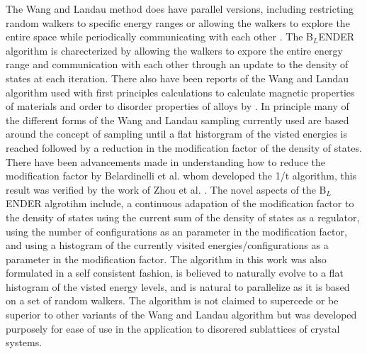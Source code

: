 \documentclass[aps,prl,reprint,superscriptaddress,showkeys]{revtex4-1}
\begin{document}
    The Wang and Landau method does have parallel versions, including  restricting random walkers to specific energy ranges or allowing the walkers to explore the entire space while periodically communicating with each other \cite{MP_Wang_Landau,P_imp_Wang_Landau, Hframe_Wang_Landau}. The B$_{L}$ENDER algorithm is charecterized by allowing the walkers to expore the entire energy range and communication with each other through an update to the density of states at each iteration. There also have been  reports of the Wang and Landau algorithm used with first principles calculations to calculate magnetic properties of materials and order to disorder properties of alloys by \cite{Eisenbach, FP_Wang_Landau_CuZn}. In principle many of the different forms of the Wang and Landau sampling currently used are based around the concept of sampling until a flat historgram of the visted energies is reached followed by a reduction in the modification factor of the density of states. There have been advancements made in understanding how to reduce the modification factor by Belardinelli et al. \cite{saturation} whom developed the 1/t algorithm, this result was verified by the work of Zhou et al. \cite{Optimal_modification}. The novel aspects of the B$_{L}$ENDER algrotihm include, a continuous adapation of the modification factor to the  density of states using the current sum of the density of states as a regulator, using the number of configurations as an parameter in the modification factor, and using a histogram of the currently visited energies/configurations as a parameter in the modification factor.  The algorithm in this work was also formulated in a self consistent fashion, is believed to naturally evolve to a flat histogram of the visted energy levels, and is natural to parallelize as it is based on a set of random walkers. The algorithm is not claimed to supercede or be superior to other variants of the Wang and Landau algorithm but was developed purposely  for ease of use in the application to disorered sublattices of crystal systems. 
\end{document}
